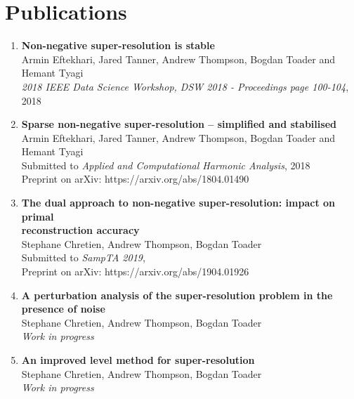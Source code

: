 \documentclass[11pt,a4paper,roman]{moderncv} %
\begin{document}
\section{Publications}


\begin{enumerate}

  \item
\textbf{Non-negative super-resolution is stable} \\
Armin Eftekhari, Jared Tanner, Andrew Thompson, Bogdan Toader and Hemant Tyagi\\
{\em 2018 IEEE Data Science Workshop, DSW 2018 - Proceedings page 100-104},
2018 
\vspace{1em}
  
  \item
\textbf{Sparse non-negative super-resolution -- simplified and stabilised} \\
Armin Eftekhari, Jared Tanner, Andrew Thompson, Bogdan Toader and Hemant Tyagi\\
Submitted to {\em Applied and Computational Harmonic Analysis},
2018 \\
Preprint on arXiv: https://arxiv.org/abs/1804.01490
\vspace{1em}

  \item
\textbf{The dual approach to non-negative super-resolution: 
  impact on primal\\ reconstruction accuracy}\\
Stephane Chretien, Andrew Thompson, Bogdan Toader\\
Submitted to {\em SampTA 2019},\\
Preprint on arXiv: https://arxiv.org/abs/1904.01926 
\vspace{1em}
\newpage
  \item
\textbf{A perturbation analysis of the super-resolution problem
in the presence of noise}\\
Stephane Chretien, Andrew Thompson, Bogdan Toader\\
{\em Work in progress}
\vspace{1em}

  \item
\textbf{An improved level method for super-resolution}\\
Stephane Chretien, Andrew Thompson, Bogdan Toader\\
{\em Work in progress}
\vspace{1em}

\end{enumerate}
\end{document}
